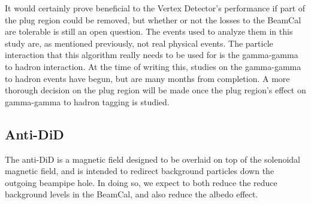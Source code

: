 \documentclass{report}
\begin{document}
                It would certainly prove beneficial to the Vertex Detector's performance if part of the plug region could be removed, but whether or not the losses to the BeamCal are tolerable is still an open question. The events used to analyze them in this study are, as mentioned previously, not real physical events. The particle interaction that this algorithm really needs to be used for is the gamma-gamma to hadron interaction. At the time of writing this, studies on the gamma-gamma to hadron events have begun, but are many months from completion. A more thorough decision on the plug region will be made once the plug region's effect on gamma-gamma to hadron tagging is studied.

            
            \subsection{Anti-DiD}
                The anti-DiD is a magnetic field designed to be overlaid on top of the solenoidal magnetic field, and is intended to redirect background particles down the outgoing beampipe hole. In doing so, we expect to both reduce the reduce background levels in the BeamCal, and also reduce the albedo effect.
\end{document}
